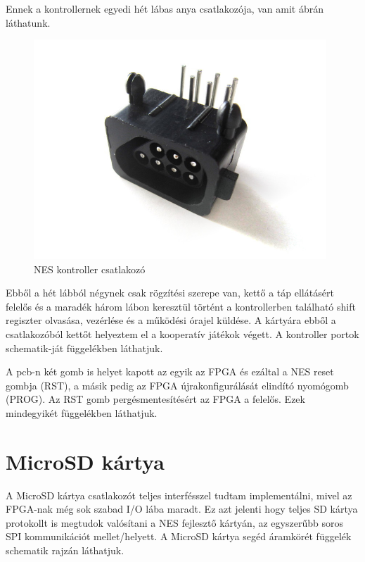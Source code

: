 	Ennek a kontrollernek egyedi hét lábas anya csatlakozója, van amit  ábrán láthatunk.   
	
	\begin{figure}[H]
		\centering
		\includegraphics[width=110mm, keepaspectratio]{figures/7pin-connector}
		\caption{NES kontroller csatlakozó}
		\label{fig:7PIN-Port}
	\end{figure}
	
	Ebből a hét lábból négynek csak rögzítési szerepe van, kettő a táp ellátásért felelős és a maradék három lábon keresztül történt a kontrollerben található shift regiszter  olvasása, vezérlése és a működési órajel küldése. A kártyára ebből a csatlakozóból kettőt helyeztem el a kooperatív játékok végett. A kontroller portok schematik-ját  függelékben láthatjuk.
	
	A pcb-n két gomb is helyet kapott az egyik az FPGA és ezáltal a NES reset gombja (RST), a másik pedig az FPGA újrakonfigurálását elindító nyomógomb (PROG). Az RST gomb pergésmentesítésért az FPGA a felelős. Ezek mindegyikét  függelékben láthatjuk. 
	
\section{MicroSD kártya}
	
	A MicroSD kártya csatlakozót teljes interfésszel tudtam implementálni, mivel az FPGA-nak még sok szabad I/O lába maradt. Ez azt jelenti hogy teljes SD kártya protokollt is megtudok valósítani a NES fejlesztő kártyán, az egyszerűbb soros SPI kommunikációt mellet/helyett. A MicroSD kártya segéd áramkörét  függelék schematik rajzán láthatjuk. 
	
